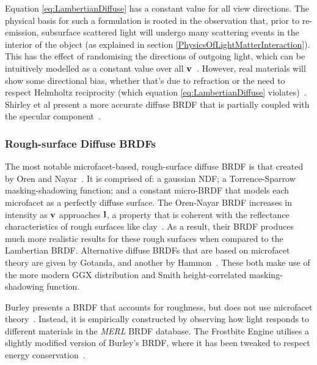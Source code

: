 Equation \ref{eq:LambertianDiffuse} has a constant value for all view directions. The physical basis for such a formulation is rooted in the observation that, prior to re-emission, subsurface scattered light will undergo many scattering events in the interior of the object (as explained in section \ref{PhysicsOfLightMatterInteraction}). This has the effect of randomising the directions of outgoing light, which can be intuitively modelled as a constant value over all \begin{math}\mathbf{v}\end{math}~\cite{HammonBRDF}. However, real materials will show some directional bias, whether that's due to refraction or the need to respect Helmholtz reciprocity (which equation \ref{eq:LambertianDiffuse} violates)~\cite{RTR4}. Shirley et al present a more accurate diffuse BRDF that is partially coupled with the specular component~\cite{PractitionersReflectionModels}.

\subsubsection{Rough-surface Diffuse BRDFs}

The most notable microfacet-based, rough-surface diffuse BRDF is that created by Oren and Nayar~\cite{OrenAndNayar}. It is comprised of: a gaussian NDF; a Torrence-Sparrow masking-shadowing function; and a constant micro-BRDF that models each microfacet as a perfectly diffuse surface. The Oren-Nayar BRDF increases in intensity as \begin{math}\mathbf{v}\end{math} approaches \begin{math}\mathbf{l}\end{math}, a property that is coherent with the reflectance characteristics of rough surfaces like clay~\cite{OrenAndNayar}. As a result, their BRDF produces much more realistic results for these rough surfaces when compared to the Lambertian BRDF. Alternative diffuse BRDFs that are based on microfacet theory are given by Gotanda, and another by Hammon~\cite{GotandaDiffuseBRDF}\cite{HammonBRDF}. These both make use of the more modern GGX distribution and Smith height-correlated masking-shadowing function.

Burley presents a BRDF that accounts for roughness, but does not use microfacet theory~\cite{Burley2012Physically}. Instead, it is empirically constructed by observing how light responds to different materials in the \textit{MERL} BRDF database. The Frostbite Engine utilises a slightly modified version of Burley's BRDF, where it has been tweaked to respect energy conservation~\cite{MovingFrostbitetoPBR}.

